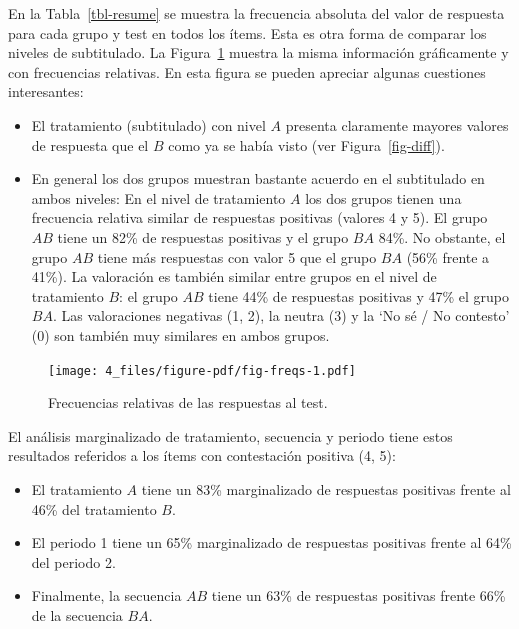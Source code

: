 \documentclass[
  12pt,
  a4paper,
  extrafontsizes,
  onecolumn,
  openright,
  table]{memoir}
\begin{document}
En la Tabla~\ref{tbl-resume} se muestra la frecuencia absoluta del valor
de respuesta para cada grupo y test en todos los ítems. Esta es otra
forma de comparar los niveles de subtitulado. La Figura~\ref{fig-freqs}
muestra la misma información gráficamente y con frecuencias relativas.
En esta figura se pueden apreciar algunas cuestiones interesantes:

\begin{itemize}
\item
  El tratamiento (subtitulado) con nivel \(A\) presenta claramente
  mayores valores de respuesta que el \(B\) como ya se había visto (ver
  Figura~\ref{fig-diff}).
\item
  En general los dos grupos muestran bastante acuerdo en el subtitulado
  en ambos niveles: En el nivel de tratamiento \(A\) los dos grupos
  tienen una frecuencia relativa similar de respuestas positivas
  (valores 4 y 5). El grupo \(AB\) tiene un 82\% de respuestas positivas
  y el grupo \(BA\) 84\%. No obstante, el grupo \(AB\) tiene más
  respuestas con valor 5 que el grupo \(BA\) (56\% frente a 41\%). La
  valoración es también similar entre grupos en el nivel de tratamiento
  \(B\): el grupo \(AB\) tiene 44\% de respuestas positivas y 47\% el
  grupo \(BA\). Las valoraciones negativas (1, 2), la neutra (3) y la
  \enquote*{No sé / No contesto} (0) son también muy similares en ambos
  grupos.
\end{itemize}

\begin{figure}[h]

{\centering \texttt{[image: 4\_files/figure-pdf/fig-freqs-1.pdf]}

}

\caption{\label{fig-freqs}Frecuencias relativas de las respuestas al
test.}

\end{figure}

El análisis marginalizado de tratamiento, secuencia y periodo tiene
estos resultados referidos a los ítems con contestación positiva (4, 5):

\begin{itemize}
\item
  El tratamiento \(A\) tiene un 83\% marginalizado de respuestas
  positivas frente al 46\% del tratamiento \(B\).
\item
  El periodo 1 tiene un 65\% marginalizado de respuestas positivas
  frente al 64\% del periodo 2.
\item
  Finalmente, la secuencia \(AB\) tiene un 63\% de respuestas positivas
  frente 66\% de la secuencia \(BA\).
\end{itemize}
\end{document}
